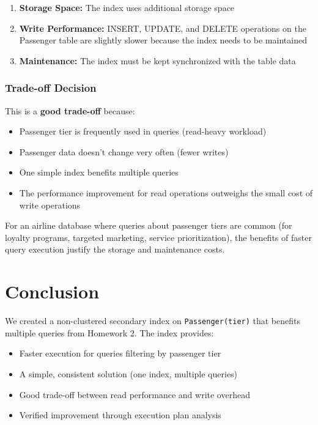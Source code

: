 \documentclass[12pt]{article}
\begin{document}
\begin{enumerate}
    \item \textbf{Storage Space:} The index uses additional storage space
    \item \textbf{Write Performance:} INSERT, UPDATE, and DELETE operations on the Passenger table are slightly slower because the index needs to be maintained
    \item \textbf{Maintenance:} The index must be kept synchronized with the table data
\end{enumerate}

\subsubsection{Trade-off Decision}

This is a \textbf{good trade-off} because:

\begin{itemize}
    \item Passenger tier is frequently used in queries (read-heavy workload)
    \item Passenger data doesn't change very often (fewer writes)
    \item One simple index benefits multiple queries
    \item The performance improvement for read operations outweighs the small cost of write operations
\end{itemize}

For an airline database where queries about passenger tiers are common (for loyalty programs, targeted marketing, service prioritization), the benefits of faster query execution justify the storage and maintenance costs.

\section{Conclusion}

We created a non-clustered secondary index on \texttt{Passenger(tier)} that benefits multiple queries from Homework 2. The index provides:

\begin{itemize}
    \item Faster execution for queries filtering by passenger tier
    \item A simple, consistent solution (one index, multiple queries)
    \item Good trade-off between read performance and write overhead
    \item Verified improvement through execution plan analysis
\end{itemize}
\end{document}
